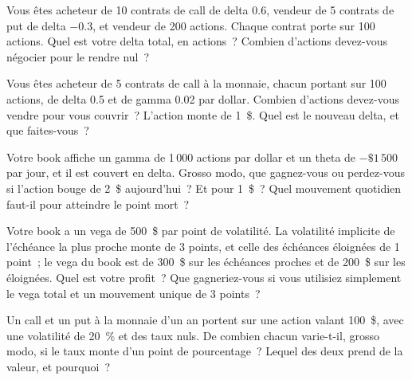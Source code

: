 \begin{question}\label{iq:iv2:options-parity-and-greeks:9}
Vous êtes acheteur de 10 contrats de call de delta 0.6, vendeur de 5 contrats de put de delta $-0.3$, et vendeur de 200 actions. Chaque contrat porte sur 100 actions. Quel est votre delta total, en actions~? Combien d'actions devez-vous négocier pour le rendre nul~?
\end{question}

\begin{question}\label{iq:iv2:options-parity-and-greeks:10}
Vous êtes acheteur de 5 contrats de call à la monnaie, chacun portant sur 100 actions, de delta 0.5 et de gamma 0.02 par dollar. Combien d'actions devez-vous vendre pour vous couvrir~? L'action monte de 1~\$. Quel est le nouveau delta, et que faites-vous~?
\end{question}

\begin{question}\label{iq:iv2:options-parity-and-greeks:11}
Votre book affiche un gamma de 1\,000 actions par dollar et un theta de $-\$1\,500$ par jour, et il est couvert en delta. Grosso modo, que gagnez-vous ou perdez-vous si l'action bouge de 2~\$ aujourd'hui~? Et pour 1~\$~? Quel mouvement quotidien faut-il pour atteindre le point mort~?
\end{question}

\begin{question}\label{iq:iv2:options-parity-and-greeks:12}
Votre book a un vega de 500~\$ par point de volatilité. La volatilité implicite de l'échéance la plus proche monte de 3 points, et celle des échéances éloignées de 1 point~; le vega du book est de 300~\$ sur les échéances proches et de 200~\$ sur les éloignées. Quel est votre profit~? Que gagneriez-vous si vous utilisiez simplement le vega total et un mouvement unique de 3 points~?
\end{question}

\begin{question}\label{iq:iv2:options-parity-and-greeks:13}
Un call et un put à la monnaie d'un an portent sur une action valant 100~\$, avec une volatilité de 20~\% et des taux nuls. De combien chacun varie-t-il, grosso modo, si le taux monte d'un point de pourcentage~? Lequel des deux prend de la valeur, et pourquoi~?
\end{question}

